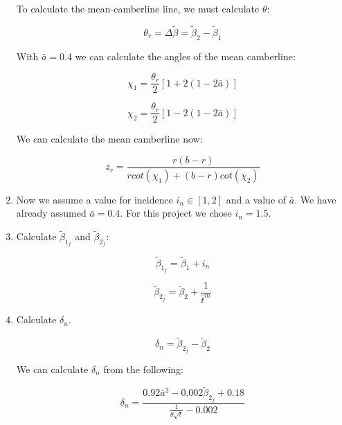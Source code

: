 \documentclass[titlepage]{article}
\begin{document}
\begin{enumerate}
    To calculate the mean-camberline line, we must calculate $\theta$:

    \begin{equation}
        \theta_{r} = \Delta \tilde{\beta} = \tilde{\beta}_{2} - \tilde{\beta}_{1}
    \end{equation}

    With $\bar{a} = 0.4$ we can calculate the angles of the mean camberline:

    \begin{equation}
        \chi_{1} = \frac{\theta_{r}}{2} \left[1 +2(1-2\bar{a})\right]
    \end{equation}

    \begin{equation}
        \chi_{2} = \frac{\theta_{r}}{2} \left[1 -2(1-2\bar{a})\right]
    \end{equation}

    We can calculate the mean camberline now:

    \begin{equation}
        z_{r} = \frac{r\left(b-r\right)}{rcot(\chi_{1}) + (b-r)cot(\chi_{2})}
    \end{equation}

    \item Now we assume a value for incidence $i_{n} \in [1, 2]$ and a value of $\bar{a}$.
    We have already assumed $\bar{a} = 0.4$. For this project we chose $i_{n} = 1.5$.

    \item Calculate $\tilde{\beta}_{1_{f}}$ and $\tilde{\beta}_{2_{f}}$:
    

    \begin{equation}
        \tilde{\beta}_{1_{f}} = \tilde{\beta}_{1} + i_{n}
    \end{equation}


    \begin{equation}
        \tilde{\beta}_{2_{f}} = \tilde{\beta}_{2} + \frac{1}{\bar{t}^{m}}
    \end{equation}

    \item Calculate $\delta_{n}$.
    
    \begin{equation}
        \delta_{n} = \tilde{\beta}_{2_{f}} - \tilde{\beta}_{2}
    \end{equation}

    We can calculate $\delta_{n}$ from the following:

    \begin{equation}
        \delta_{n} = \frac{0.92\bar{a}^{2} - 0.002 \tilde{\beta}_{2_{f}}+0.18}{\frac{1}{\theta \sqrt{t}} - 0.002}
    \end{equation}


\end{enumerate}
\end{document}
